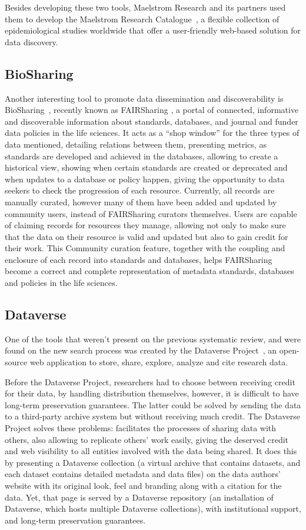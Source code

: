 Besides developing these two tools, Maelstrom Research and its partners used them to develop the Maelstrom Research Catalogue~\cite{maelstrom}, a flexible collection of epidemiological studies worldwide that offer a user-friendly web-based solution for data discovery.

\subsection*{BioSharing}
Another interesting tool to promote data dissemination and discoverability is BioSharing~\cite{biosharing}, recently known as FAIRSharing \cite{fairsharing}, a portal of connected, informative and discoverable information about standards, databases, and journal and funder data policies in the life sciences.
It acts as a ``shop window'' for the three types of data mentioned, detailing relations between them, presenting metrics, as standards are developed and achieved in the databases, allowing to create a historical view, showing when certain standards are created or deprecated and when updates to a database or policy happen, giving the opportunity to data seekers to check the progression of each resource.
Currently, all records are manually curated, however many of them have been added and updated by community users, instead of FAIRSharing curators themselves.
Users are capable of claiming records for resources they manage, allowing not only to make sure that the data on their resource is valid and updated but also to gain credit for their work.
This Community curation feature, together with the coupling and enclosure of each record into standards and databases, helps FAIRSharing become a correct and complete representation of metadata standards, databases and policies in the life sciences.

\subsection*{Dataverse}
One of the tools that weren't present on the previous systematic review, and were found on the new search process was created by the Dataverse Project~\cite{dataverse}, an open-source web application to store, share, explore, analyze and cite research data.

Before the Dataverse Project, researchers had to choose between receiving credit for their data, by handling distribution themselves, however, it is difficult to have long-term preservation guarantees.
The latter could be solved by sending the data to a third-party archive system but without receiving much credit.
The Dataverse Project solves these problems: facilitates the processes of sharing data with others, also allowing to replicate others' work easily, giving the deserved credit and web visibility to all entities involved with the data being shared.
It does this by presenting a Dataverse collection (a virtual archive that contains datasets, and each dataset contains detailed metadata and data files) on the data authors' website with its original look, feel and branding along with a citation for the data.
Yet, that page is served by a Dataverse repository (an installation of Dataverse, which hosts multiple Dataverse collections), with institutional support, and long-term preservation guarantees.

